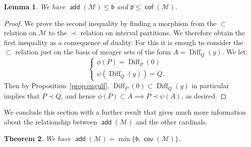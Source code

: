 \documentclass[11pt,oneside]{amsbook}
\newcommand{\Meager}{\mathcal M}
\DeclareMathOperator{\add}{\mathsf{add}}
\DeclareMathOperator{\cov}{\mathsf{cov}}
\DeclareMathOperator{\cof}{\mathsf{cof}}
\DeclareMathOperator{\Diff}{Diff}
\theoremstyle{definition}
\theoremstyle{plain}
\newtheorem{thm}{Theorem}[section]
\newtheorem{lem}[thm]{Lemma}
\theoremstyle{definition}
\theoremstyle{remark}
\numberwithin{equation}{section}
\numberwithin{figure}{section}
\begin{document}
\begin{lem}
  We have $\add(\Meager)\leq\mathfrak b$ and $\mathfrak d\leq\cof(\Meager)$.
\end{lem}

\begin{proof}
  We prove the second inequality by finding a morphism from the $\subset$ relation on $\Meager$ to the $\prec$ relation on interval partitions. We therefore obtain the first inequality as a consequence of duality. For this it is enough to consider the $\subset$ relation just on the basis of meager sets of the form $A=\Diff_Q(y)$. We let:
  \[\begin{cases}\phi(P)=\Diff_P(0)\\\psi(\Diff_Q(y))=Q\text{.}\end{cases}
  \]
  Then by Proposition~\ref{prop:engulf}, $\Diff_P(0)\subset\Diff_Q(y)$ in particular implies that $P\prec Q$, and hence $\phi(P)\subset A\implies P\prec\psi(A)$, as desired.
\end{proof}

We conclude this section with a further result that gives much more information about the relationship between $\add(\Meager)$ and the other cardinals.

\begin{thm}
  We have $\add(\Meager)=\min\{\mathfrak b,\cov(\Meager)\}$.
\end{thm}
\end{document}
